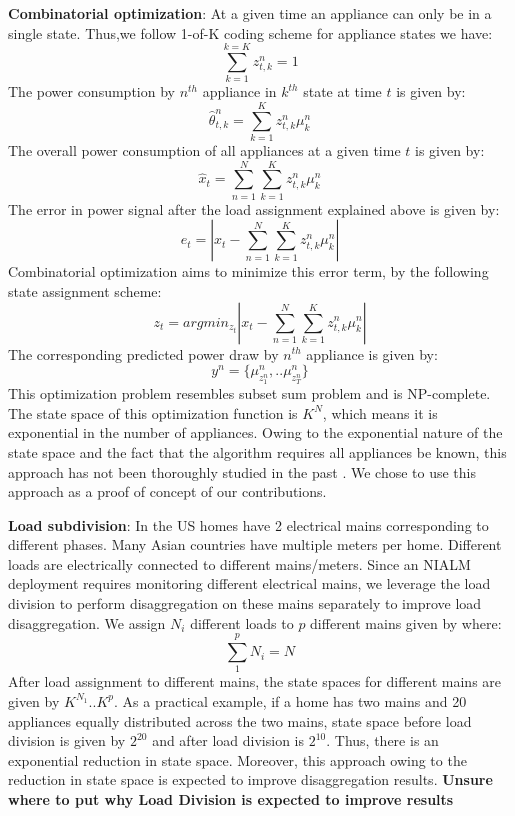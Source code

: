 \documentclass[conference]{IEEEtran}
\begin{document}
\textbf{Combinatorial optimization}:
At a given time an appliance can only be in a single state. Thus,we follow 1-of-K coding scheme for appliance states we have:
\begin{equation}
\sum\limits_{k=1}^{k=K} z_{t,k}^n=1
\end{equation}
The power consumption by $n^{th}$ appliance in $k^{th}$ state at time $t$ is given by:
\begin{equation}
\hat{\theta}^n_{t,k}=\sum\limits_{k=1}^{K} z_{t,k}^n \mu_k^n
\end{equation}
The overall power consumption of all appliances at a given time $t$ is given by:
\begin{equation}
\hat{x}_{t}=\sum\limits_{n=1}^{N}\sum\limits_{k=1}^{K} z_{t,k}^n \mu_k^n
\end{equation}
The error in power signal after the load assignment explained above is given by:
\begin{equation}
e_t=|x_t-\sum\limits_{n=1}^{N}\sum\limits_{k=1}^{K}z_{t,k}^n\mu_k^n|
\end{equation}
Combinatorial optimization aims to minimize this error term, by the following state assignment scheme:
\begin{equation}
z_t=arg min_{z_t}|x_t-\sum\limits_{n=1}^{N}\sum\limits_{k=1}^{K}z_{t,k}^n\mu_k^n|
\end{equation}
The corresponding predicted power draw by $n^{th}$ appliance is given by:
\begin{equation}
y^n=\{\mu_{z_1^n}^n,..\mu_{z_T^n}^n \}
\end{equation}
This optimization problem resembles subset sum problem \cite{knapsack} and is NP-complete. The state space of this optimization function is $K^N$, which means it is exponential in the number of appliances. Owing to the exponential nature of the state space and the fact that the algorithm requires all appliances be known, this approach has not been thoroughly studied in the past \cite{parson2012_aaai}. We chose to use this approach as a proof of concept of our contributions.

\textbf{Load subdivision}: In the US homes have 2 electrical mains corresponding to different phases. Many Asian countries have multiple meters per home. Different loads are electrically connected to different mains/meters. Since an NIALM deployment requires monitoring different electrical mains, we leverage the load division to perform disaggregation on these mains separately to improve load disaggregation. We assign $N_i$ different loads to $p$ different mains given by where:
\begin{equation}
\sum\limits_{1}^{p}{N_i}=N
\end{equation}
After load assignment to different mains, the state spaces for different mains are given by $K^{N_1}..K^{p}$. As a practical example, if a home has two mains and 20 appliances equally distributed across the two mains, state space before load division is given by $2^{20}$ and after load division is $2^{10}$. Thus, there is an exponential reduction in state space. Moreover, this approach owing to the reduction in state space is expected to improve disaggregation results. \textbf{Unsure where to put why Load Division is expected to improve results}
\end{document}
